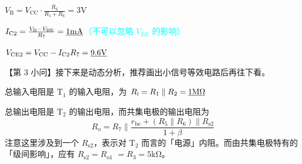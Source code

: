\documentclass[UTF8]{ctexart}
\newcommand\Emph[1]{\colorbox{red!20!}{\textcolor{red!80!black}{#1}}}
\newcommand\xb[1]{_\mathrm{#1}}
\begin{document}
$V\xb{B} = V\xb{CC}\cdot \frac{R_6}{R_5+R_6} = \mathrm{3V}$

\newpage
{}
\BgThispage
\phantom{...}
\vspace{0.5cm}

$I\xb{C2} = \frac{V\xb{B}-V\xb{BE}}{R_7} = \uline{\mathrm{1mA}}$\textcolor{cyan}{（不可以忽略 $V\xb{BE}$ 的影响）}

$V\xb{CE2} = V\xb{CC} - I\xb{C2}R_7 = \uline{\mathrm{9.6V}}$

\noindent 【第 3 小问】接下来是动态分析，推荐画出小信号等效电路后再往下看。

总输入电阻是 $\mathrm{T_1}$ 的输入电阻，为 $R\xb{i} = R_1 \parallel R_2 = \uline{\mathrm{1M\Omega}}$

总输出电阻是 $\mathrm{T_2}$ 的输出电阻，而共集电极的输出电阻为
\begin{equation}
    R\xb{o} = R_7\parallel \dfrac{r\xb{be} + (R_5\parallel R_6)\parallel R\xb{s2}}{1+\beta}
\end{equation}
注意这里涉及到一个 $R\xb{s2}$，表示对 $\mathrm{T_2}$ 而言的「电源」内阻。而由共集电极特有的「级间影响」，应有 \Emph{$R\xb{s2} = R\xb{o1}$} $= R_3 = \mathrm{5k\Omega}$。
\end{document}
